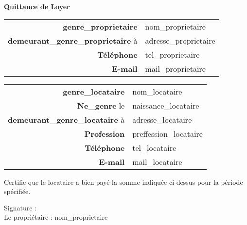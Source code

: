\documentclass{article}
\begin{document}
\begin{center}
    \Large\textbf{Quittance de Loyer}
\end{center}

\noindent

\begin{tabular}{rl}
    \textbf{{{genre_proprietaire}}} & {{nom_proprietaire}} \\
    \textbf{{{demeurant_genre_proprietaire}}} à & {{adresse_proprietaire}} \\
    \textbf{Téléphone} & {{tel_proprietaire}} \\
    \textbf{E-mail} & {{mail_proprietaire}}
\end{tabular}

\vspace{0.5cm}

\begin{tabular}{rl}
    \textbf{{{genre_locataire}}} & {{nom_locataire}} \\
    \textbf{{{Ne_genre}}} le & {{naissance_locataire}} \\
    \textbf{{{demeurant_genre_locataire}}} à & {{adresse_locataire}} \\
    \textbf{Profession} & {{preffession_locataire}} \\
    \textbf{Téléphone} & {{tel_locataire}} \\
    \textbf{E-mail} & {{mail_locataire}}
\end{tabular}

\vspace{1cm}

\noindent
Certifie que le locataire a bien payé la somme indiquée ci-dessus pour la période spécifiée.

\vspace{2cm}

\noindent
Signature : \\
Le propriétaire : {{nom_proprietaire}}
\end{document}
